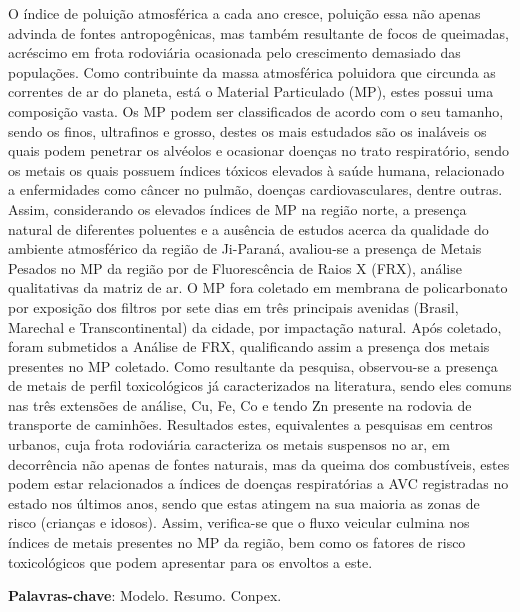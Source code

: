 \documentclass[article,12pt,onesidea,4paper,english,brazil]{abntex2}
\begin{document}
	\noindent O índice de poluição atmosférica a cada ano cresce, poluição essa não apenas
	advinda de fontes antropogênicas, mas também resultante de focos de queimadas,
	acréscimo em frota rodoviária ocasionada pelo crescimento demasiado das
	populações. Como contribuinte da massa atmosférica poluidora que circunda as
	correntes de ar do planeta, está o Material Particulado (MP), estes possui uma
	composição vasta. Os MP podem ser classificados de acordo com o seu tamanho,
	sendo os finos, ultrafinos e grosso, destes os mais estudados são os inaláveis os
	quais podem penetrar os alvéolos e ocasionar doenças no trato respiratório, sendo
	os metais os quais possuem índices tóxicos elevados à saúde humana, relacionado
	a enfermidades como câncer no pulmão, doenças cardiovasculares, dentre outras.
	Assim, considerando os elevados índices de MP na região norte, a presença natural
	de diferentes poluentes e a ausência de estudos acerca da qualidade do ambiente
	atmosférico da região de Ji-Paraná, avaliou-se a presença de Metais Pesados no
	MP da região por de Fluorescência de Raios X (FRX), análise qualitativas da matriz
	de ar. O MP fora coletado em membrana de policarbonato por exposição dos filtros
	por sete dias em três principais avenidas (Brasil, Marechal e Transcontinental) da
	cidade, por impactação natural. Após coletado, foram submetidos a Análise de FRX,
	qualificando assim a presença dos metais presentes no MP coletado. Como
	resultante da pesquisa, observou-se a presença de metais de perfil toxicológicos já
	caracterizados na literatura, sendo eles comuns nas três extensões de análise, Cu,
	Fe, Co e tendo Zn presente na rodovia de transporte de caminhões. Resultados
	estes, equivalentes a pesquisas em centros urbanos, cuja frota rodoviária
	caracteriza os metais suspensos no ar, em decorrência não apenas de fontes
	naturais, mas da queima dos combustíveis, estes podem estar relacionados a
	índices de doenças respiratórias a AVC registradas no estado nos últimos anos,
	sendo que estas atingem na sua maioria as zonas de risco (crianças e idosos).
	Assim, verifica-se que o fluxo veicular culmina nos índices de metais presentes no
	MP da região, bem como os fatores de risco toxicológicos que podem apresentar para os 
	envoltos a este.
	
	\vspace{\onelineskip}
	
	\noindent
	\textbf{Palavras-chave}: Modelo. Resumo. Conpex.
	
\end{document}
